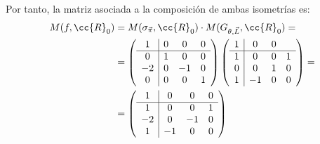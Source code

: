 \begin{ejercicio}
    Por tanto, la matriz asociada a la composición de ambas isometrías es:
    \begin{align*}
        M(f, \cc{R}_0) &= M(\sigma_{\vec{\pi}}, \cc{R}_0) \cdot M(G_{\theta, \vec{L}}, \cc{R}_0) =\\
        &= \left(
        \begin{array}{c|ccc}
            1 & 0 & 0 & 0 \\ \hline
            0 & 1 & 0 & 0 \\
            -2 & 0 & -1 & 0 \\
            0 & 0 & 0 & 1
        \end{array}
        \right)
        \left(
        \begin{array}{c|ccc}
            1 & 0 & 0 &  \\ \hline
            1 & 0 & 0 & 1 \\
            0 & 0 & 1 & 0 \\
            1 & -1 & 0 & 0
        \end{array}
        \right)
        =\\
        &= \left(
        \begin{array}{c|ccc}
            1 & 0 & 0 & 0 \\ \hline
            1 & 0 & 0 & 1 \\
            -2 & 0 & -1 & 0 \\
            1 & -1 & 0 & 0
        \end{array}
        \right)
    \end{align*}
\end{ejercicio}

